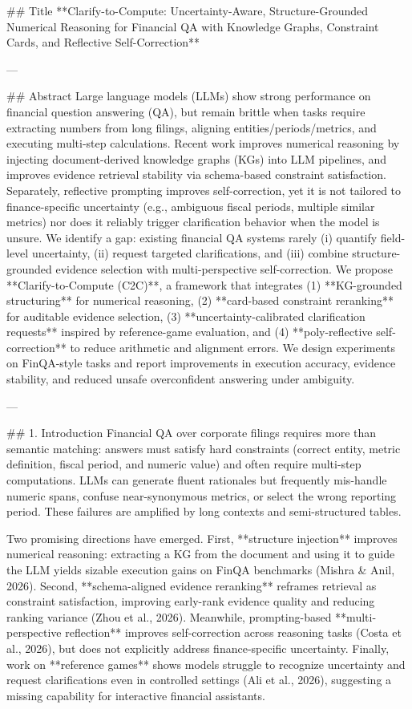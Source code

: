 ## Title  
**Clarify-to-Compute: Uncertainty-Aware, Structure-Grounded Numerical Reasoning for Financial QA with Knowledge Graphs, Constraint Cards, and Reflective Self-Correction**

---

## Abstract  
Large language models (LLMs) show strong performance on financial question answering (QA), but remain brittle when tasks require extracting numbers from long filings, aligning entities/periods/metrics, and executing multi-step calculations. Recent work improves numerical reasoning by injecting document-derived knowledge graphs (KGs) into LLM pipelines, and improves evidence retrieval stability via schema-based constraint satisfaction. Separately, reflective prompting improves self-correction, yet it is not tailored to finance-specific uncertainty (e.g., ambiguous fiscal periods, multiple similar metrics) nor does it reliably trigger clarification behavior when the model is unsure. We identify a gap: existing financial QA systems rarely (i) quantify field-level uncertainty, (ii) request targeted clarifications, and (iii) combine structure-grounded evidence selection with multi-perspective self-correction. We propose **Clarify-to-Compute (C2C)**, a framework that integrates (1) **KG-grounded structuring** for numerical reasoning, (2) **card-based constraint reranking** for auditable evidence selection, (3) **uncertainty-calibrated clarification requests** inspired by reference-game evaluation, and (4) **poly-reflective self-correction** to reduce arithmetic and alignment errors. We design experiments on FinQA-style tasks and report improvements in execution accuracy, evidence stability, and reduced unsafe overconfident answering under ambiguity.  

---

## 1. Introduction  
Financial QA over corporate filings requires more than semantic matching: answers must satisfy hard constraints (correct entity, metric definition, fiscal period, and numeric value) and often require multi-step computations. LLMs can generate fluent rationales but frequently mis-handle numeric spans, confuse near-synonymous metrics, or select the wrong reporting period. These failures are amplified by long contexts and semi-structured tables.

Two promising directions have emerged. First, **structure injection** improves numerical reasoning: extracting a KG from the document and using it to guide the LLM yields sizable execution gains on FinQA benchmarks (Mishra & Anil, 2026). Second, **schema-aligned evidence reranking** reframes retrieval as constraint satisfaction, improving early-rank evidence quality and reducing ranking variance (Zhou et al., 2026). Meanwhile, prompting-based **multi-perspective reflection** improves self-correction across reasoning tasks (Costa et al., 2026), but does not explicitly address finance-specific uncertainty. Finally, work on **reference games** shows models struggle to recognize uncertainty and request clarifications even in controlled settings (Ali et al., 2026), suggesting a missing capability for interactive financial assistants.

